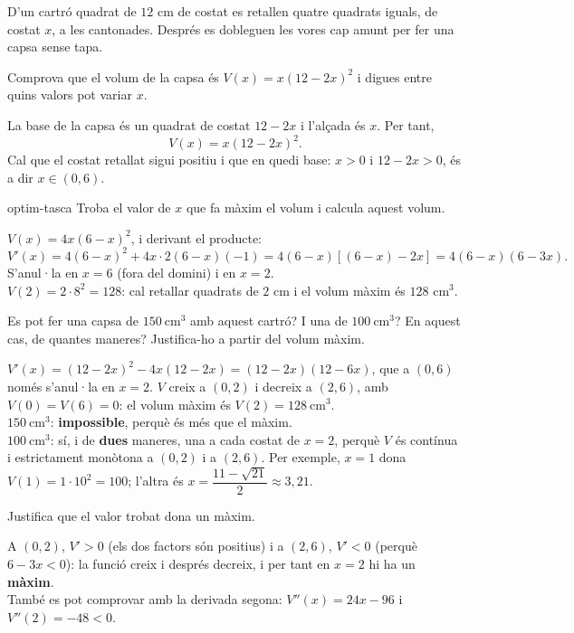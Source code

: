 D'un cartró quadrat de $12$ cm de costat es retallen quatre quadrats iguals, de costat $x$, a
les cantonades. Després es dobleguen les vores cap amunt per fer una capsa sense tapa.

\begin{apartats}

Comprova que el volum de la capsa és $V(x)=x(12-2x)^2$ i digues entre quins valors pot variar
$x$.

\begin{solucio}
La base de la capsa és un quadrat de costat $12-2x$ i l'alçada és $x$. Per tant,
\[
V(x)=x(12-2x)^2 .
\]
Cal que el costat retallat sigui positiu i que en quedi base: $x>0$ i $12-2x>0$, és a dir
$x\in(0,6)$.
\end{solucio}

\begin{tria}{optim-tasca}
Troba el valor de $x$ que fa màxim el volum i calcula aquest volum.

\begin{solucio}
$V(x)=4x(6-x)^2$, i derivant el producte:
\[
V'(x)=4(6-x)^2+4x\cdot2(6-x)(-1)=4(6-x)\left[(6-x)-2x\right]=4(6-x)(6-3x).
\]
S'anul·la en $x=6$ (fora del domini) i en $x=2$.\\
$V(2)=2\cdot8^2=128$: cal retallar quadrats de $\boxed{2}$ cm i el volum màxim és
$\boxed{128}$ cm$^3$.
\end{solucio}

Es pot fer una capsa de $150\ \text{cm}^3$ amb aquest cartró? I una de $100\ \text{cm}^3$? En aquest
cas, de quantes maneres? Justifica-ho a partir del volum màxim.

\begin{solucio}
$V'(x)=(12-2x)^2-4x(12-2x)=(12-2x)(12-6x)$, que a $(0,6)$ només s'anul·la en $x=2$. $V$ creix a
$(0,2)$ i decreix a $(2,6)$, amb $V(0)=V(6)=0$: el volum màxim és $V(2)=128\ \text{cm}^3$.\\
$150\ \text{cm}^3$: \textbf{impossible}, perquè és més que el màxim.\\
$100\ \text{cm}^3$: sí, i de \textbf{dues} maneres, una a cada costat de $x=2$, perquè $V$ és
contínua i estrictament monòtona a $(0,2)$ i a $(2,6)$. Per exemple, $x=1$ dona
$V(1)=1\cdot10^2=100$; l'altra és $x=\dfrac{11-\sqrt{21}}{2}\approx3{,}21$.
\end{solucio}
\end{tria}

\begin{nomesllarg}
Justifica que el valor trobat dona un màxim.

\begin{solucio}
A $(0,2)$, $V'>0$ (els dos factors són positius) i a $(2,6)$, $V'<0$ (perquè $6-3x<0$): la
funció creix i després decreix, i per tant en $x=2$ hi ha un \textbf{màxim}.\\
També es pot comprovar amb la derivada segona: $V''(x)=24x-96$ i $V''(2)=-48<0$.
\end{solucio}
\end{nomesllarg}

\end{apartats}
